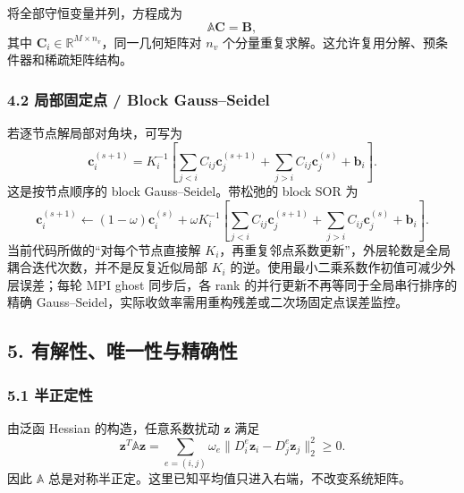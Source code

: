 \documentclass[
  12pt,
  UTF8]{ctexart}
\begin{document}
将全部守恒变量并列，方程成为 \begin{equation}
\mathbb A\boldsymbol C=\boldsymbol B,\end{equation} 其中 \(\boldsymbol C_i\in\mathbb R^{M\times n_v}\)，同一几何矩阵对
\(n_v\) 个分量重复求解。这允许复用分解、预条件器和稀疏矩阵结构。

\hypertarget{ux5c40ux90e8ux56faux5b9aux70b9-block-gaussseidel}{%
\subsubsection{4.2 局部固定点 / Block
Gauss--Seidel}\label{ux5c40ux90e8ux56faux5b9aux70b9-block-gaussseidel}}

若逐节点解局部对角块，可写为 \begin{equation}
\boldsymbol c_i^{(s+1)}=K_i^{-1}\left[
\sum_{j<i}C_{ij}\boldsymbol c_j^{(s+1)}+
\sum_{j>i}C_{ij}\boldsymbol c_j^{(s)}+
\boldsymbol b_i\right].\end{equation} 这是按节点顺序的 block Gauss--Seidel。带松弛的 block SOR 为 \begin{equation}
\boldsymbol c_i^{(s+1)}\leftarrow
(1-\omega)\boldsymbol c_i^{(s)}+
\omega K_i^{-1}\left[
\sum_{j<i}C_{ij}\boldsymbol c_j^{(s+1)}+
\sum_{j>i}C_{ij}\boldsymbol c_j^{(s)}+\boldsymbol b_i\right].\end{equation} 当前代码所做的``对每个节点直接解
\(K_i\)，再重复邻点系数更新''，外层轮数是全局耦合迭代次数，并不是反复近似局部
\(K_i\) 的逆。使用最小二乘系数作初值可减少外层误差；每轮 MPI ghost
同步后，各 rank 的并行更新不再等同于全局串行排序的精确
Gauss--Seidel，实际收敛率需用重构残差或二次场固定点误差监控。

\hypertarget{ux6709ux89e3ux6027ux552fux4e00ux6027ux4e0eux7cbeux786eux6027}{%
\subsection{5.
有解性、唯一性与精确性}\label{ux6709ux89e3ux6027ux552fux4e00ux6027ux4e0eux7cbeux786eux6027}}

\hypertarget{ux534aux6b63ux5b9aux6027}{%
\subsubsection{5.1 半正定性}\label{ux534aux6b63ux5b9aux6027}}

由泛函 Hessian 的构造，任意系数扰动 \(\boldsymbol z\) 满足 \begin{equation}
\boldsymbol z^T\mathbb A\boldsymbol z=
\sum_{e=(i,j)}\omega_e
\|D_i^e\boldsymbol z_i-D_j^e\boldsymbol z_j\|_2^2\ge 0.\end{equation} 因此 \(\mathbb A\)
总是对称半正定。这里已知平均值只进入右端，不改变系统矩阵。
\end{document}
